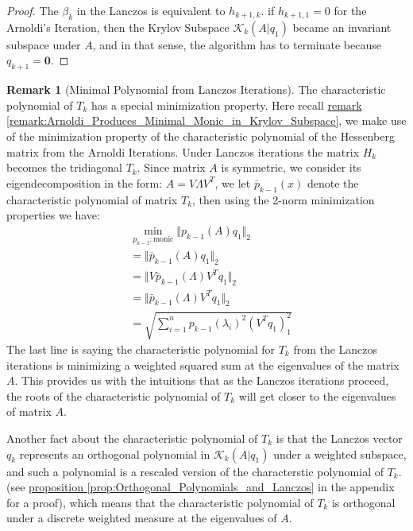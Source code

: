 \documentclass[]{article}
\theoremstyle{definition}
\newtheorem{remark}{Remark}[subsection]  %
\begin{document}
            \begin{proof}
                The $\beta_{k}$ in the Lanczos is equivalent to $h_{k + 1, k}$. if $h_{k + 1, 1} = 0$ for the Arnoldi's Iteration, then the Krylov Subspace $\mathcal K_k(A|q_1)$ became an invariant subspace under $A$, and in that sense, the algorithm has to terminate because $q_{k + 1} = \mathbf{0}$. 
            \end{proof}
            \begin{remark}[Minimal Polynomial from Lanczos Iterations]\label{remark:Minimal_Polynomial_from_Lanczos_Iterations}
                The characteristic polynomial of $T_k$ has a special minimization property. Here recall \hyperref[remark:Arnoldi_Produces_Minimal_Monic_in_Krylov_Subspace]{remark \ref*{remark:Arnoldi_Produces_Minimal_Monic_in_Krylov_Subspace}}, we make use of the minimization property of the characteristic polynomial of the Hessenberg matrix from the Arnoldi Iterations. Under Lanczos iterations the matrix $H_k$ becomes the tridiagonal $T_k$. Since matrix $A$ is symmetric, we consider its eigendecomposition in the form: $A = V\Lambda V^T$, we let $\bar{p}_{k - 1}(x)$ denote the characteristic polynomial of matrix $T_k$, then using the 2-norm minimization properties we have: 
                \begin{align}
                    & \min_{p_{k - 1}:\text{monic}} \Vert p_{k - 1}(A)q_1\Vert_2
                    \\
                    & =\Vert \overline{p}_{k - 1}(A)q_1\Vert_2
                    \\
                    & = \Vert V \bar{p}_{k - 1}(\Lambda)V^Tq_1\Vert_2
                    \\
                    & = \Vert \bar{p}_{k - 1}(\Lambda)V^Tq_1\Vert_2
                    \\
                    &= \sqrt{
                        \sum_{i = 1}^n p_{k - 1}(\lambda_i)^2(V^Tq_1)^2_1
                    }
                \end{align}
                The last line is saying the characteristic polynomial for $T_k$ from the Lanczos iterations is minimizing a weighted squared sum at the eigenvalues of the matrix $A$. This provides us with the intuitions that as the Lanczos iterations proceed, the roots of the characteristic polynomial of $T_k$ will get closer to the eigenvalues of matrix $A$.
                \par
                Another fact about the characteristic polynomial of $T_k$ is that the Lanczos vector $q_k$ represents an orthogonal polynomial in $\mathcal K_k(A|q_1)$ under a weighted subspace, and such a polynomial is a rescaled version of the characterstic polynomial of $T_k$. (see \hyperref[prop:Orthogonal_Polynomials_and_Lanczos]{proposition \ref*{prop:Orthogonal_Polynomials_and_Lanczos}} in the appendix for a proof), which means that the characteristic polynomial of $T_k$ is orthogonal under a discrete weighted measure at the eigenvalues of $A$. 
            \end{remark}
            
\end{document}
